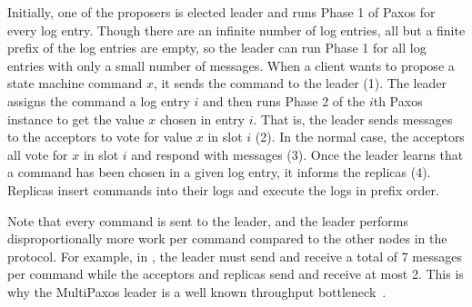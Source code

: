 {}

Initially, one of the proposers is elected leader and runs Phase 1 of Paxos for
every log entry. Though there are an infinite number of log entries, all but a
finite prefix of the log entries are empty, so the leader can run Phase 1 for
all log entries with only a small number of messages.
%
When a client wants to propose a state machine command
$x$, it sends the command to the leader (1). The leader assigns the command a
log entry $i$ and then runs Phase 2 of the $i$th Paxos instance to get the
value $x$ chosen in entry $i$. That is, the leader sends 
messages to the acceptors to vote for value $x$ in slot $i$ (2). In the normal
case, the acceptors all vote for $x$ in slot $i$ and respond with
 messages (3). Once the leader learns that a command has
been chosen in a given log entry, it informs the replicas (4). Replicas insert
commands into their logs and execute the logs in prefix order.

Note that every command is sent to the leader, and the leader performs
disproportionally more work per command compared to the other nodes in the
protocol. For example, in , the leader must send and receive
a total of 7 messages per command while the acceptors and replicas send and
receive at most 2. This is why the MultiPaxos leader is a well known throughput
bottleneck~\cite{mao2008mencius, moraru2013there}.
